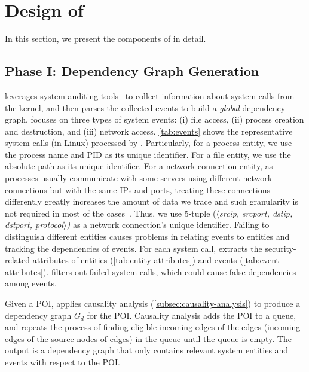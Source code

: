 \section{Design of \tool}
\label{sec:approach}

In this section, we present the 
components of \tool in detail.


\subsection{Phase I: Dependency Graph Generation}
\label{subsec:graph-generation}

\tool leverages system auditing tools~\cite{auditd,etw,dtrace,sysdig} to collect information about system calls from the kernel, and then parses the collected events to build a \emph{global} dependency graph.
\tool focuses on three types of system events: 
(i) file access, 
(ii) process creation and destruction, and
(iii) network access.
\cref{tab:events} shows the representative system calls (in Linux) processed by \tool.
Particularly, for a process entity, we use the process name and PID as its unique identifier.
For a file entity, we use the absolute path as its unique identifier. 
For a network 
connection entity, as processes usually communicate with some servers using different network connections but with the same IPs and ports, treating these connections differently greatly increases the amount of data we trace and such granularity is not required in most of the cases~\cite{liu2018priotracker,gao2018aiql,gao2018saql}. Thus, we use 5-tuple (\emph{$\langle$srcip, srcport, dstip, dstport, protocol$\rangle$)} as a network 
connection's
unique identifier. 
Failing to distinguish different entities causes problems in relating events to entities and tracking
the dependencies of events.
For each system call, \tool extracts 
the security-related attributes of entities (\cref{tab:entity-attributes}) and events (\cref{tab:event-attributes}).
\tool filters out failed system calls, which could cause false dependencies among events.


Given a POI, \tool applies causality analysis (\cref{subsec:causality-analysis}) to produce a dependency graph $G_d$ for the POI.
Causality analysis adds the POI to a queue, and repeats the process of finding eligible incoming edges of the edges (\ie incoming edges of the source nodes of edges) in the queue until the queue is empty. The output is a dependency graph that only contains relevant system entities and events with respect to the POI.

